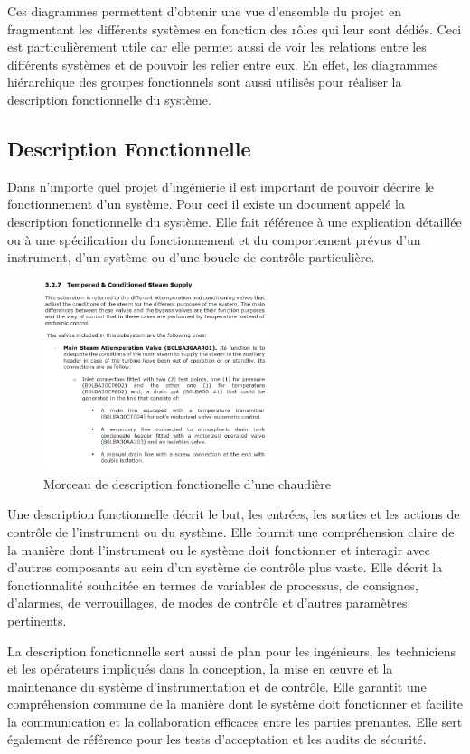 \documentclass[11pt, openright]{book}
\begin{document}
Ces diagrammes permettent d'obtenir une vue d'ensemble du projet en fragmentant les différents systèmes en fonction des rôles qui leur sont dédiés. Ceci est particulièrement utile car elle permet aussi de voir les relations entre les différents systèmes et de pouvoir les relier entre eux. En effet, les diagrammes hiérarchique des groupes fonctionnels sont aussi utilisés pour réaliser la description fonctionnelle du système.

\subsection{Description Fonctionnelle}

Dans n'importe quel projet d'ingénierie il est important de pouvoir décrire le fonctionnement d'un système. Pour ceci il existe un document appelé la description fonctionnelle du système. Elle fait référence à une explication détaillée ou à une spécification du fonctionnement et du comportement prévus d'un instrument, d'un système ou d'une boucle de contrôle particulière.


\begin{figure}[ht!]
    \centering
    \includegraphics[width=0.6\textwidth]{./object/FD.png }
    \caption{Morceau de description fonctionelle d'une chaudière}
\end{figure}

Une description fonctionnelle décrit le but, les entrées, les sorties et les actions de contrôle de l'instrument ou du système. Elle fournit une compréhension claire de la manière dont l'instrument ou le système doit fonctionner et interagir avec d'autres composants au sein d'un système de contrôle plus vaste. Elle décrit la fonctionnalité souhaitée en termes de variables de processus, de consignes, d'alarmes, de verrouillages, de modes de contrôle et d'autres paramètres pertinents.

La description fonctionnelle sert aussi de plan pour les ingénieurs, les techniciens et les opérateurs impliqués dans la conception, la mise en œuvre et la maintenance du système d'instrumen\-tation et de contrôle. Elle garantit une compréhension commune de la manière dont le système doit fonctionner et facilite la communication et la collaboration efficaces entre les parties prenantes. Elle sert également de référence pour les tests d'acceptation et les audits de sécurité.
\end{document}
